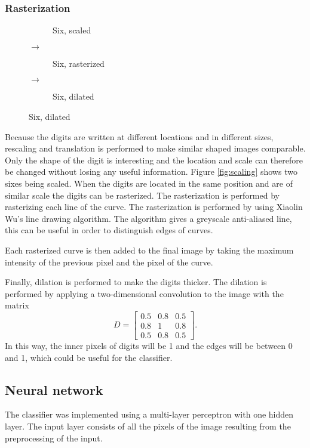 \documentclass[report.tex]{subfile}
\begin{document}
\subsubsection{Rasterization}
\begin{figure}
    \centering
    \begin{subfigure}[c]{0.3\textwidth}
        \resizebox{\textwidth}{!}{}
        \caption{Six, scaled}
    \end{subfigure}%
    {\Large $\rightarrow$}
    \begin{subfigure}[c]{0.3\textwidth}
        \caption{Six, rasterized}
    \end{subfigure}
    {\Large $\rightarrow$}
    \begin{subfigure}[c]{0.3\textwidth}
        \caption{Six, dilated}
    \end{subfigure}%
\end{figure}
Because the digits are written at different locations and in different sizes,
rescaling and translation is performed to make similar shaped images
comparable. Only the shape of the digit is interesting and the location and
scale can therefore be changed without losing any useful information. Figure
\ref{fig:scaling} shows two sixes being scaled.
When the digits are located in the same position and are of similar scale the
digits can be rasterized. The rasterization is performed by rasterizing each
line of the curve. The rasterization is performed by using Xiaolin Wu's line
drawing algorithm. The algorithm gives a greyscale anti-aliased line, this can
be useful in order to distinguish edges of curves.

Each rasterized curve is then added to the final image by taking the maximum
intensity of the previous pixel and the pixel of the curve.

Finally, dilation is performed to make the digits thicker. The dilation is
performed by applying a two-dimensional convolution to the image with the
matrix
\begin{equation*}
    D =
    \begin{bmatrix}
        0.5 & 0.8 & 0.5 \\
        0.8 &   1 & 0.8 \\
        0.5 & 0.8 & 0.5
    \end{bmatrix}.
\end{equation*}
In this way, the inner pixels of digits will be 1 and the edges will be between
0 and 1, which could be useful for the classifier.

\subsection{Neural network}
The classifier was implemented using a multi-layer perceptron with one hidden
layer. The input layer consists of all the pixels of the image resulting from
the preprocessing of the input.
\end{document}
